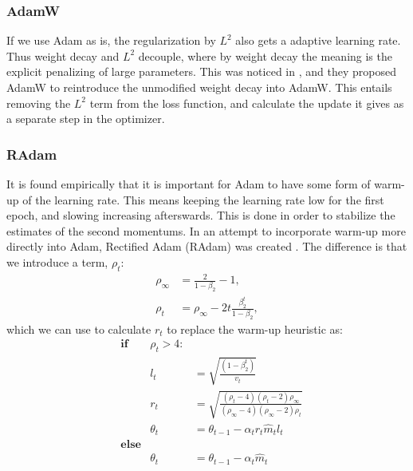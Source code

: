 \subsubsection{AdamW}
If we use \ac{Adam} as is, the regularization by $L^2$ also gets a adaptive learning rate.
Thus weight decay and $L^2$ decouple, where by weight decay the meaning is the explicit penalizing of large parameters.
This was noticed in \cite{loshchilovFixingWeightDecay2018}, and they proposed AdamW to reintroduce the unmodified weight decay into AdamW. 
This entails removing the $L^2$ term from the loss function, and calculate the update it gives as a separate step in the optimizer.

\subsubsection{RAdam}
It is found empirically that it is important for \ac{Adam} to have some form of warm-up of the learning rate.
This means keeping the learning rate low for the first epoch, and slowing increasing afterswards. 
This is done in order to stabilize the estimates of the second momentums.
In an attempt to incorporate warm-up more directly into \ac{Adam}, Rectified Adam (RAdam) was created \cite{liuVarianceAdaptiveLearning2020}. The difference is that we introduce a term, $\rho_t$: 
\begin{align}
	\rho_\infty &= \frac{2}{1-\beta_{2}} - 1, \\
	\rho_t      &= \rho_\infty - 2 t \frac{\beta_{2}^t}{1-\beta_{2}}, 
\end{align} 
which we can use to calculate $r_t$ to replace the warm-up heuristic as:
\begin{align}
	&\textbf{if}\:& \rho_t > 4: & \\ 
	&&l_t 	    &= \sqrt{\frac{(1-\beta_{2}^t)}{v_t}}\\
	&&r_t         &= \sqrt{\frac{(\rho_t - 4)(\rho_t - 2)\rho_\infty}{(\rho_\infty - 4)(\rho_\infty-2)\rho_t}} \\
	&&\theta_{t} &= \theta_{t-1} - \alpha_t r_t \hat{m}_t l_t \\
	&\textbf{else}& &\\
	&&\theta_{t} &= \theta_{t-1} - \alpha_t \hat{m}_t 
\end{align}

